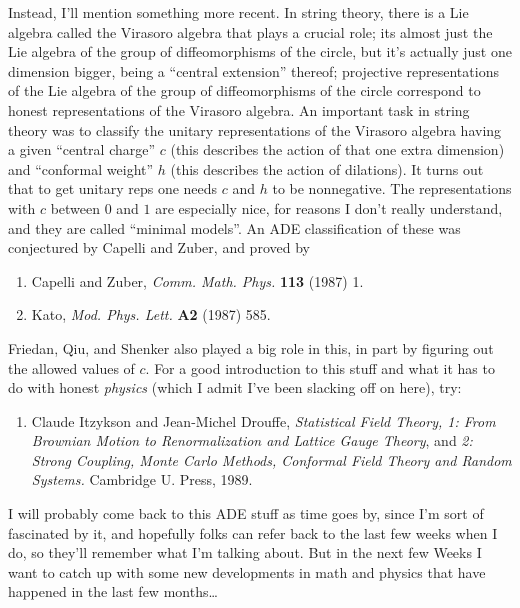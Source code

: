 \documentclass{article}
\def\tightlist{}
\begin{document}
Instead, I'll mention something more recent. In string theory, there is
a Lie algebra called the Virasoro algebra that plays a crucial role; its
almost just the Lie algebra of the group of diffeomorphisms of the
circle, but it's actually just one dimension bigger, being a ``central
extension'' thereof; projective representations of the Lie algebra of
the group of diffeomorphisms of the circle correspond to honest
representations of the Virasoro algebra. An important task in string
theory was to classify the unitary representations of the Virasoro
algebra having a given ``central charge'' \(c\) (this describes the
action of that one extra dimension) and ``conformal weight'' \(h\) (this
describes the action of dilations). It turns out that to get unitary
reps one needs \(c\) and \(h\) to be nonnegative. The representations
with \(c\) between \(0\) and \(1\) are especially nice, for reasons I
don't really understand, and they are called ``minimal models''. An ADE
classification of these was conjectured by Capelli and Zuber, and proved
by

\begin{enumerate}
\def\labelenumi{\arabic{enumi})}
\setcounter{enumi}{6}
\item
  Capelli and Zuber, \emph{Comm. Math. Phys.} \textbf{113} (1987) 1.
\item
  Kato, \emph{Mod. Phys. Lett.} \textbf{A2} (1987) 585.
\end{enumerate}

Friedan, Qiu, and Shenker also played a big role in this, in part by
figuring out the allowed values of \(c\). For a good introduction to
this stuff and what it has to do with honest \emph{physics} (which I
admit I've been slacking off on here), try:

\begin{enumerate}
\def\labelenumi{\arabic{enumi})}
\setcounter{enumi}{8}
\tightlist
\item
  Claude Itzykson and Jean-Michel Drouffe, \emph{Statistical Field
  Theory, 1: From Brownian Motion to Renormalization and Lattice Gauge
  Theory}, and \emph{2: Strong Coupling, Monte Carlo Methods, Conformal
  Field Theory and Random Systems.} Cambridge U. Press, 1989.
\end{enumerate}

I will probably come back to this ADE stuff as time goes by, since I'm
sort of fascinated by it, and hopefully folks can refer back to the last
few weeks when I do, so they'll remember what I'm talking about. But in
the next few Weeks I want to catch up with some new developments in math
and physics that have happened in the last few months\ldots{}
\end{document}
